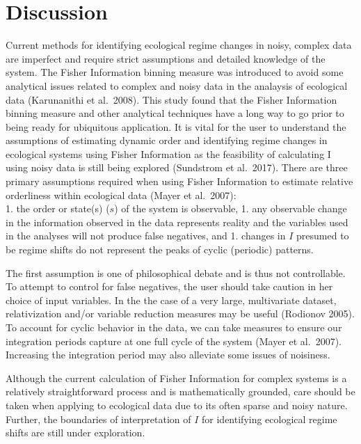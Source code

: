 \documentclass[12pt,twoside]{reedthesis}
\begin{document}
\hypertarget{discussion-1}{%
\section{Discussion}\label{discussion-1}}

Current methods for identifying ecological regime changes in noisy, complex data are imperfect and require strict assumptions and detailed knowledge of the system. The Fisher Information binning measure was introduced to avoid some analytical issues related to complex and noisy data in the analaysis of ecological data (Karunanithi et al.~2008). This study found that the Fisher Information binning measure and other analytical techniques have a long way to go prior to being ready for ubiquitous application.
It is vital for the user to understand the assumptions of estimating dynamic order and identifying regime changes in ecological systems using Fisher Information as the feasibility of calculating I using noisy data is still being explored (Sundstrom et al.~2017). There are three primary assumptions required when using Fisher Information to estimate relative orderliness within ecological data (Mayer et al.~2007):\\
1. the order or state(s) (\(s\)) of the system is observable,
1. any observable change in the information observed in the data represents reality and the variables used in the analyses will not produce false negatives, and
1. changes in \(I\) presumed to be regime shifts do not represent the peaks of cyclic (periodic) patterns.

The first assumption is one of philosophical debate and is thus not controllable. To attempt to control for false negatives, the user should take caution in her choice of input variables. In the the case of a very large, multivariate dataset, relativization and/or variable reduction measures may be useful (Rodionov 2005). To account for cyclic behavior in the data, we can take measures to ensure our integration periods capture at one full cycle of the system (Mayer et al.~2007). Increasing the integration period may also alleviate some issues of noisiness.

Although the current calculation of Fisher Information for complex systems is a relatively straightforward process and is mathematically grounded, care should be taken when applying to ecological data due to its often sparse and noisy nature. Further, the boundaries of interpretation of \(I\) for identifying ecological regime shifts are still under exploration.
\end{document}
